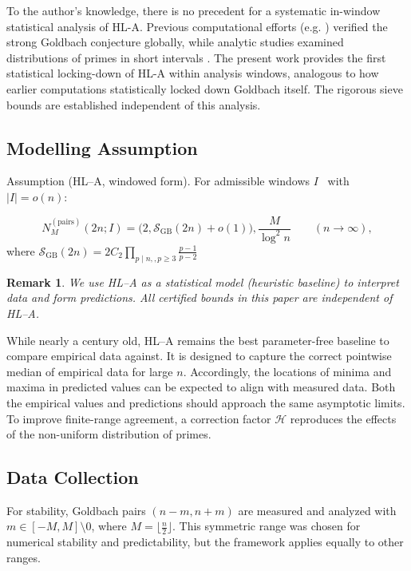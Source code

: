 \documentclass[11pt]{article}
\theoremstyle{inline}
\newtheorem*{remark}{Remark}
\theoremstyle{break}
\theoremstyle{break}
\theoremstyle{break}
\theoremstyle{break}
\theoremstyle{break}
\theoremstyle{break}
\theoremstyle{break}
\theoremstyle{inline}
\newcommand{\SGB}{\mathcal{S}_{\scriptscriptstyle\mathrm{GB}}}
\newcommand{\HLCorr}{\mathcal{H}}
\begin{document}
To the author’s knowledge, there is no precedent for a systematic in-window statistical analysis of HL-A. Previous computational efforts (e.g. \cite{OliveiraESilva2014}) verified the strong Goldbach conjecture globally, while analytic studies examined distributions of primes in short intervals \cite{MontgomerySoundararajan2004,GranvilleSoundararajan2007}. The present work provides the first statistical locking-down of HL-A within analysis windows, analogous to how earlier computations statistically locked down Goldbach itself.  The rigorous sieve bounds are established independent of this analysis.

\subsection{Modelling Assumption}
Assumption (HL–A, windowed form). For admissible windows \( I \)  with \( \lvert I \rvert = o(n) \):

\begin{equation}
N_M^{(\mathrm{pairs})}(2n;I)  = \Big(2,\SGB(2n) + o(1)\Big),\frac{M}{\log^2 n}
\qquad(n\to\infty),
\end{equation}
where \( \SGB(2n) = 2C_2\prod_{p\mid n,,p\ge3} \frac{p-1}{p-2} \)

\begin{remark}
We use HL–A as a statistical model (heuristic baseline) to interpret data and form predictions. All certified bounds in this paper are independent of HL–A.
\end{remark}

While nearly a century old, HL–A remains the best parameter-free baseline to compare empirical data against. It is designed to capture the correct pointwise median of empirical data for large \( n \). Accordingly, the locations of minima and maxima in predicted values can be expected to align with measured data. Both the empirical values and predictions should approach the same asymptotic limits. To improve finite-range agreement, a correction factor \( \HLCorr \) reproduces the effects of the non-uniform distribution of primes.


\subsection{Data Collection}

For stability, Goldbach pairs \( (n-m, n+m) \) are measured and analyzed with \( m \in [-M,M] \setminus{0} \), where \( M=\lfloor \frac{n}{2} \rfloor \). This symmetric range was chosen for numerical stability and predictability, but the framework applies equally to other ranges.
\end{document}
